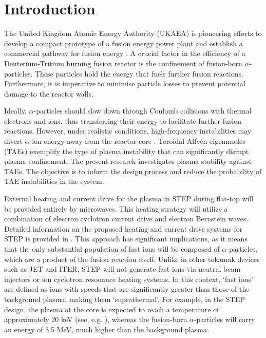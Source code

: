 \documentclass[10pt, a4paper, twoside]{article}
\begin{document}
\section{Introduction}
\label{sec:introduction}

The United Kingdom Atomic Energy Authority (UKAEA) is pioneering efforts to develop a compact prototype of a fusion energy power plant and establish a commercial pathway for fusion energy \cite{nuttall2020, meyer2023}. A crucial factor in the efficiency of a Deuterium-Tritium burning fusion reactor is the confinement of fusion-born $\alpha$-particles. These particles hold the energy that fuels further fusion reactions. Furthermore, it is imperative to minimise particle losses to prevent potential damage to the reactor walls.

Ideally, $\alpha$-particles should slow down through Coulomb collisions with thermal electrons and ions, thus transferring their energy to facilitate further fusion reactions. However, under realistic conditions, high-frequency instabilities may divert $\alpha$-ion energy away from the reactor core \cite{belova2015}. Toroidal Alfv\'en eigenmodes (TAEs) exemplify the type of plasma instability that can significantly disrupt plasma confinement. The present research investigates plasma stability against TAEs. The objective is to inform the design process and reduce the probability of TAE instabilities in the system.

External heating and current drive for the plasma in STEP during flat-top will be provided entirely by microwaves. This heating strategy will utilize a combination of electron cyclotron current drive and electron Bernstein waves. Detailed information on the proposed heating and current drive systems for STEP is provided in \cite{freethy2023}.
This approach has significant implications, as it means that the only substantial population of fast ions will be composed of $\alpha$-particles, which are a product of the fusion reaction itself. Unlike in other tokamak devices such as JET and ITER, STEP will not generate fast ions via neutral beam injectors or ion cyclotron resonance heating systems.
In this context, `fast ions' are defined as ions with speeds that are significantly greater than those of the background plasma, making them `suprathermal'. For example, in the STEP design, the plasma at the core is expected to reach a temperature of approximately 20 keV (see, e.g. \cite{meyer2023,mitchell2023}), whereas the fusion-born $\alpha$-particles will carry an energy of 3.5 MeV, much higher than the background plasma.
\end{document}
